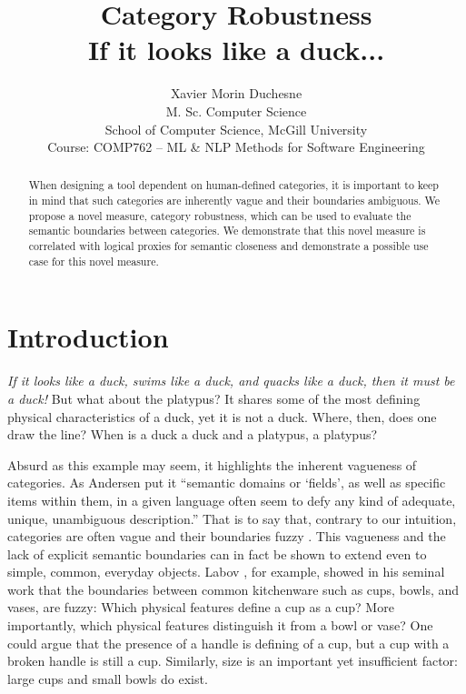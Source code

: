 \documentclass[letterpaper, 12 pt, conference]{ieeeconf}
\title{
    {\LARGE \bf Category Robustness\\}
    {\Large If it looks like a duck...}
}
\author{
Xavier Morin Duchesne\\%
M. Sc. Computer Science\\
School of Computer Science, McGill University\\
Course: COMP762 -- ML \& NLP Methods for Software Engineering 
}
\begin{document}
\maketitle
\thispagestyle{empty}
\pagestyle{empty}

\begin{abstract}
When designing a tool dependent on human-defined categories, it is important to keep in mind that such categories are inherently vague and their boundaries ambiguous. We propose a novel measure, category robustness, which can be used to evaluate the semantic boundaries between categories. We demonstrate that this novel measure is correlated with logical proxies for semantic closeness and demonstrate a possible use case for this novel measure.
\end{abstract}

\section{Introduction}


\textit{If it looks like a duck, swims like a duck, and quacks like a duck, then it must be a duck!} But what about the platypus? It shares some of the most defining physical characteristics of a duck, yet it is not a duck. Where, then, does one draw the line? When is a duck a duck and a platypus, a platypus?

Absurd as this example may seem, it highlights the inherent vagueness of categories. As Andersen put it ``semantic domains or `fields', as well as specific items within them, in a given language often seem to defy any kind of adequate, unique, unambiguous description.'' \cite{andersen:cups_and_glasses:1975} That is to say that, contrary to our intuition, categories are often vague and their boundaries fuzzy \cite{lehrer1970indeterminacy}. This vagueness and the lack of explicit semantic boundaries can in fact be shown to extend even to simple, common, everyday objects. Labov \cite{labov:boundares:1973}, for example, showed in his seminal work that the boundaries between common kitchenware such as cups, bowls, and vases, are fuzzy: Which physical features define a cup as a cup? More importantly, which physical features distinguish it from a bowl or vase? One could argue that the presence of a handle is defining of a cup, but a cup with a broken handle is still a cup. Similarly, size is an important yet insufficient factor: large cups and small bowls do exist.
\end{document}
